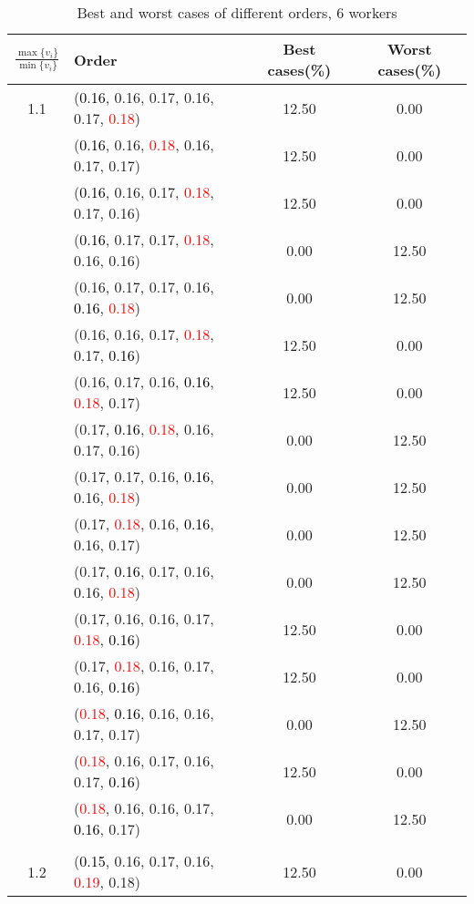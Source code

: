 \documentclass[10pt,a4paper]{report}
\begin{document}
\newpage\begin{center}
	\small
	\begin{longtable}{clcc}
		\caption{Best and worst cases of different orders, 6 workers}\\
		\toprule
		\setlength{\tabcolsep}{1mm}
		\renewcommand\baselinestretch{0.5}\selectfont
		$\frac{\max\{v_i\}}{\min\{v_i\}}$ & Order & Best cases(\%) & Worst cases(\%) \\
			\midrule		1.1			&(\textcolor{black}{0.16}, 0.16, 0.17, 0.16, 0.17, \textcolor{red}{0.18})&12.50&0.00\\
			&(\textcolor{black}{0.16}, 0.16, \textcolor{red}{0.18}, 0.16, 0.17, 0.17)&12.50&0.00\\
			&(\textcolor{black}{0.16}, 0.16, 0.17, \textcolor{red}{0.18}, 0.17, 0.16)&12.50&0.00\\
			&(\textcolor{black}{0.16}, 0.17, 0.17, \textcolor{red}{0.18}, 0.16, 0.16)&0.00&12.50\\
			&(0.16, 0.17, 0.17, 0.16, \textcolor{black}{0.16}, \textcolor{red}{0.18})&0.00&12.50\\
			&(0.16, 0.16, 0.17, \textcolor{red}{0.18}, 0.17, \textcolor{black}{0.16})&12.50&0.00\\
			&(0.16, 0.17, 0.16, \textcolor{black}{0.16}, \textcolor{red}{0.18}, 0.17)&12.50&0.00\\
			&(0.17, \textcolor{black}{0.16}, \textcolor{red}{0.18}, 0.16, 0.17, 0.16)&0.00&12.50\\
			&(0.17, 0.17, 0.16, \textcolor{black}{0.16}, 0.16, \textcolor{red}{0.18})&0.00&12.50\\
			&(0.17, \textcolor{red}{0.18}, 0.16, \textcolor{black}{0.16}, 0.16, 0.17)&0.00&12.50\\
			&(0.17, \textcolor{black}{0.16}, 0.17, 0.16, 0.16, \textcolor{red}{0.18})&0.00&12.50\\
			&(0.17, 0.16, 0.16, 0.17, \textcolor{red}{0.18}, \textcolor{black}{0.16})&12.50&0.00\\
			&(0.17, \textcolor{red}{0.18}, 0.16, 0.17, 0.16, \textcolor{black}{0.16})&12.50&0.00\\
			&(\textcolor{red}{0.18}, \textcolor{black}{0.16}, 0.16, 0.16, 0.17, 0.17)&0.00&12.50\\
			&(\textcolor{red}{0.18}, 0.16, 0.17, 0.16, 0.17, \textcolor{black}{0.16})&12.50&0.00\\
			&(\textcolor{red}{0.18}, 0.16, 0.16, 0.17, \textcolor{black}{0.16}, 0.17)&0.00&12.50\\
		&&&\\
		1.2			&(\textcolor{black}{0.15}, 0.16, 0.17, 0.16, \textcolor{red}{0.19}, 0.18)&12.50&0.00\\

\end{longtable}
\end{center}
\end{document}
